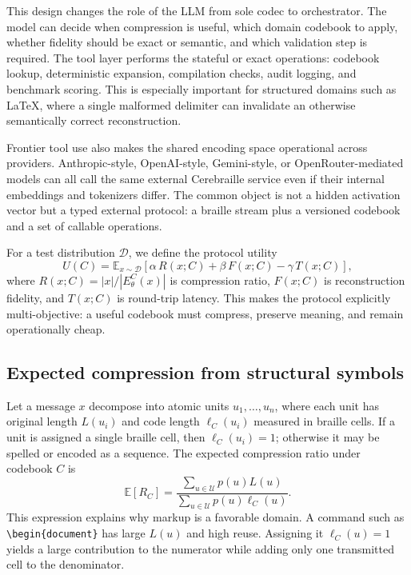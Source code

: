 \documentclass[11pt]{article}
\begin{document}
This design changes the role of the LLM from sole codec to orchestrator. The model can decide when compression is useful, which domain codebook to apply, whether fidelity should be exact or semantic, and which validation step is required. The tool layer performs the stateful or exact operations: codebook lookup, deterministic expansion, compilation checks, audit logging, and benchmark scoring. This is especially important for structured domains such as LaTeX, where a single malformed delimiter can invalidate an otherwise semantically correct reconstruction.

Frontier tool use also makes the shared encoding space operational across providers. Anthropic-style, OpenAI-style, Gemini-style, or OpenRouter-mediated models can all call the same external Cerebraille service even if their internal embeddings and tokenizers differ. The common object is not a hidden activation vector but a typed external protocol: a braille stream plus a versioned codebook and a set of callable operations.

For a test distribution $\mathcal{D}$, we define the protocol utility
\begin{equation}
  U(C) = \mathbb{E}_{x \sim \mathcal{D}}
  \left[
    \alpha \, R(x; C) + \beta \, F(x; C) - \gamma \, T(x; C)
  \right],
\end{equation}
where $R(x;C)=|x|/|E_{\theta}^{C}(x)|$ is compression ratio, $F(x;C)$ is reconstruction fidelity, and $T(x;C)$ is round-trip latency. This makes the protocol explicitly multi-objective: a useful codebook must compress, preserve meaning, and remain operationally cheap.

\subsection{Expected compression from structural symbols}
Let a message $x$ decompose into atomic units $u_1,\ldots,u_n$, where each unit has original length $L(u_i)$ and code length $\ell_C(u_i)$ measured in braille cells. If a unit is assigned a single braille cell, then $\ell_C(u_i)=1$; otherwise it may be spelled or encoded as a sequence. The expected compression ratio under codebook $C$ is
\begin{equation}
  \mathbb{E}[R_C]
  =
  \frac{\sum_{u \in \mathcal{U}} p(u) L(u)}
       {\sum_{u \in \mathcal{U}} p(u) \ell_C(u)}.
\end{equation}
This expression explains why markup is a favorable domain. A command such as \verb|\begin{document}| has large $L(u)$ and high reuse. Assigning it $\ell_C(u)=1$ yields a large contribution to the numerator while adding only one transmitted cell to the denominator.
\end{document}
